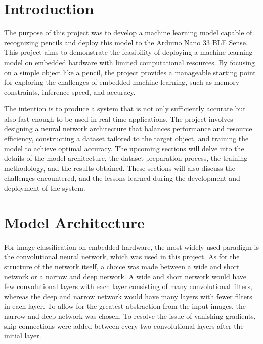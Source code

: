 \documentclass{article}
\begin{document}

\raggedright

\section{Introduction}

The purpose of this project was to develop a machine
learning model capable of recognizing pencils and deploy
this model to the Arduino Nano 33 BLE Sense. This project
aims to demonstrate the feasibility of deploying a machine
learning model on embedded hardware with limited
computational resources. By focusing on a simple object like
a pencil, the project provides a manageable starting point
for exploring the challenges of embedded machine learning,
such as memory constraints, inference speed, and accuracy.

The intention is to produce a system that is not only
sufficiently accurate but also fast enough to be used in
real-time applications. The project involves designing a
neural network architecture that balances performance and
resource efficiency, constructing a dataset tailored to the
target object, and training the model to achieve optimal
accuracy. The upcoming sections will delve into the details
of the model architecture, the dataset preparation process,
the training methodology, and the results obtained. These
sections will also discuss the challenges encountered, and
the lessons learned during the development and deployment of
the system.

\section{Model Architecture}
For image classification on embedded hardware, the most
widely used paradigm is the convolutional neural network,
which was used in this project. As for the structure of the
network itself, a choice was made between a wide and short
network or a narrow and deep network. A wide and short
network would have few convolutional layers with each layer
consisting of many convolutional filters, whereas the deep
and narrow network would have many layers with fewer filters
in each layer. To allow for the greatest abstraction from
the input images, the narrow and deep network was chosen. To
resolve the issue of vanishing gradients, skip connections
were added between every two convolutional layers after the
initial layer. 
\end{document}
